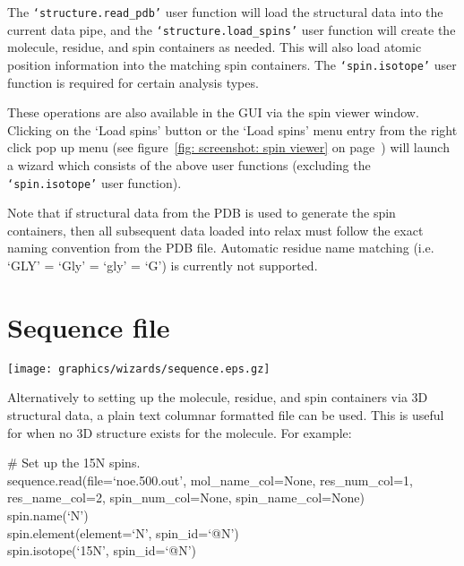 The \texttt{`structure.read\_pdb'} user function will load the structural data into the current data pipe, and the \texttt{`structure.load\_spins'} user function will create the molecule, residue, and spin containers as needed.  This will also load atomic position information into the matching spin containers.  The \texttt{`spin.isotope'} user function is required for certain analysis types.

These operations are also available in the GUI via the spin viewer window.  Clicking on the `Load spins' button or the `Load spins' menu entry from the right click pop up menu (see figure~\ref{fig: screenshot: spin viewer} on page~\pageref{fig: screenshot: spin viewer}) will launch a wizard which consists of the above user functions (excluding the \texttt{`spin.isotope'} user function).

Note that if structural data from the PDB is used to generate the spin containers, then all subsequent data loaded into relax must follow the exact naming convention from the PDB file.  Automatic residue name matching (i.e. `GLY' = `Gly' = `gly' = `G') is currently not supported.




\section{Sequence file}

\begin{figure*}[h]
\texttt{[image: graphics/wizards/sequence.eps.gz]}
\end{figure*}

Alternatively to setting up the molecule, residue, and spin containers via 3D structural data, a plain text columnar formatted file can be used.  This is useful for when no 3D structure exists for the molecule.  For example:

\begin{exampleenv}
\# Set up the 15N spins. \\
sequence.read(file=`noe.500.out', mol\_name\_col=None, res\_num\_col=1, res\_name\_col=2, spin\_num\_col=None, spin\_name\_col=None) \\
spin.name(`N') \\
spin.element(element=`N', spin\_id=`@N') \\
spin.isotope(`15N', spin\_id=`@N')
\end{exampleenv}

